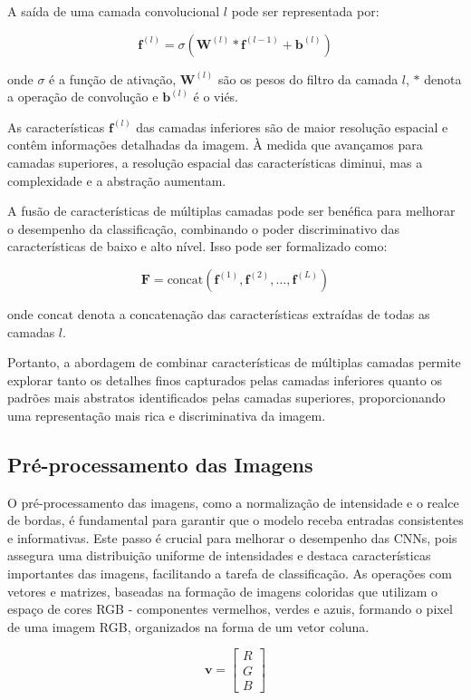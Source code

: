 \documentclass{article}
\begin{document}
A saída de uma camada convolucional \( l \) pode ser representada por:

\[
\mathbf{f}^{(l)} = \sigma(\mathbf{W}^{(l)} * \mathbf{f}^{(l-1)} + \mathbf{b}^{(l)})
\]

onde \( \sigma \) é a função de ativação, \( \mathbf{W}^{(l)} \) são os pesos do filtro da camada \( l \), \( * \) denota a operação de convolução e \( \mathbf{b}^{(l)} \) é o viés.

As características \( \mathbf{f}^{(l)} \) das camadas inferiores são de maior resolução espacial e contêm informações detalhadas da imagem. À medida que avançamos para camadas superiores, a resolução espacial das características diminui, mas a complexidade e a abstração aumentam. 

A fusão de características de múltiplas camadas pode ser benéfica para melhorar o desempenho da classificação, combinando o poder discriminativo das características de baixo e alto nível. Isso pode ser formalizado como:

\[
\mathbf{F} = \text{concat}(\mathbf{f}^{(1)}, \mathbf{f}^{(2)}, \ldots, \mathbf{f}^{(L)})
\]

onde \( \text{concat} \) denota a concatenação das características extraídas de todas as camadas \( l \).

Portanto, a abordagem de combinar características de múltiplas camadas permite explorar tanto os detalhes finos capturados pelas camadas inferiores quanto os padrões mais abstratos identificados pelas camadas superiores, proporcionando uma representação mais rica e discriminativa da imagem.

\subsection{Pré-processamento das Imagens}

O pré-processamento das imagens, como a normalização de intensidade e o realce de bordas, é fundamental para garantir que o modelo receba entradas consistentes e informativas. Este passo é crucial para melhorar o desempenho das CNNs, pois assegura uma distribuição uniforme de intensidades e destaca características importantes das imagens, facilitando a tarefa de classificação. As operações com vetores e matrizes, baseadas na formação de imagens coloridas que utilizam o espaço de cores RGB - componentes vermelhos, verdes e azuis, formando o pixel de uma imagem RGB, organizados na forma de um vetor coluna.

\[
\mathbf{v} = \begin{bmatrix}
R \\
G \\
B
\end{bmatrix}
\]
\end{document}
